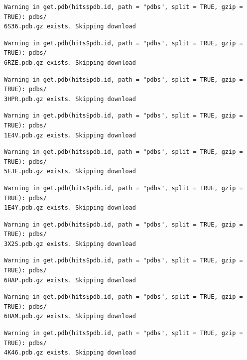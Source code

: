 \documentclass[
  letterpaper,
  DIV=11,
  numbers=noendperiod]{scrartcl}
\begin{document}
\begin{verbatim}
Warning in get.pdb(hits$pdb.id, path = "pdbs", split = TRUE, gzip = TRUE): pdbs/
6S36.pdb.gz exists. Skipping download
\end{verbatim}

\begin{verbatim}
Warning in get.pdb(hits$pdb.id, path = "pdbs", split = TRUE, gzip = TRUE): pdbs/
6RZE.pdb.gz exists. Skipping download
\end{verbatim}

\begin{verbatim}
Warning in get.pdb(hits$pdb.id, path = "pdbs", split = TRUE, gzip = TRUE): pdbs/
3HPR.pdb.gz exists. Skipping download
\end{verbatim}

\begin{verbatim}
Warning in get.pdb(hits$pdb.id, path = "pdbs", split = TRUE, gzip = TRUE): pdbs/
1E4V.pdb.gz exists. Skipping download
\end{verbatim}

\begin{verbatim}
Warning in get.pdb(hits$pdb.id, path = "pdbs", split = TRUE, gzip = TRUE): pdbs/
5EJE.pdb.gz exists. Skipping download
\end{verbatim}

\begin{verbatim}
Warning in get.pdb(hits$pdb.id, path = "pdbs", split = TRUE, gzip = TRUE): pdbs/
1E4Y.pdb.gz exists. Skipping download
\end{verbatim}

\begin{verbatim}
Warning in get.pdb(hits$pdb.id, path = "pdbs", split = TRUE, gzip = TRUE): pdbs/
3X2S.pdb.gz exists. Skipping download
\end{verbatim}

\begin{verbatim}
Warning in get.pdb(hits$pdb.id, path = "pdbs", split = TRUE, gzip = TRUE): pdbs/
6HAP.pdb.gz exists. Skipping download
\end{verbatim}

\begin{verbatim}
Warning in get.pdb(hits$pdb.id, path = "pdbs", split = TRUE, gzip = TRUE): pdbs/
6HAM.pdb.gz exists. Skipping download
\end{verbatim}

\begin{verbatim}
Warning in get.pdb(hits$pdb.id, path = "pdbs", split = TRUE, gzip = TRUE): pdbs/
4K46.pdb.gz exists. Skipping download
\end{verbatim}
\end{document}
